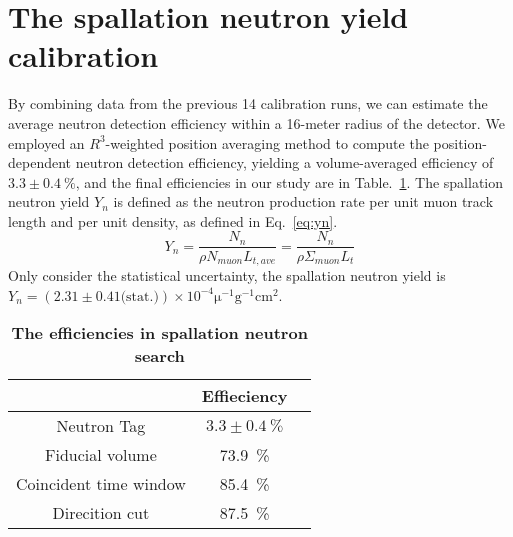 \section{The spallation neutron yield calibration}
By combining data from the previous 14 calibration runs, we can estimate the average neutron detection efficiency within a 16-meter radius of the detector. We employed an $R^3$-weighted position averaging method to compute the position-dependent neutron detection efficiency, yielding a volume-averaged efficiency of $3.3\pm\SI{0.4}{\%}$, and the final efficiencies in our study are in Table.~\ref{tab:spn_eff}.
The spallation neutron yield $Y_n$ is defined as the neutron production rate per unit muon track length and per unit density, as defined in Eq.~\eqref{eq:yn}.
\begin{equation}
	\label{eq:yn}
	Y_n = \frac{N_n}{\rho N_{muon}L_{t,ave}}= \frac{N_n}{\rho \Sigma_{muon} L_t}
\end{equation}
Only consider the statistical uncertainty, the spallation neutron yield is $Y_n = (2.31\pm0.41 \text{(stat.)})\times 10^{-4} \mathrm{\mu}^{-1}\text{g}^{-1}\text{cm}^2$.
\begin{table}[H]
	\caption{\textbf{The efficiencies in spallation neutron search}}%
	\label{tab:spn_eff}
	\centering%
	\begin{tabular}{ccc}
		\toprule%
		                       & Effieciency          \\
		\midrule%
		Neutron Tag            & $3.3\pm\SI{0.4}{\%}$ \\
		Fiducial volume        & \SI{73.9}{\%}        \\
		Coincident time window & \SI{85.4}{\%}        \\
		Direcition cut         & \SI{87.5}{\%}        \\
		\bottomrule
	\end{tabular}
\end{table}


